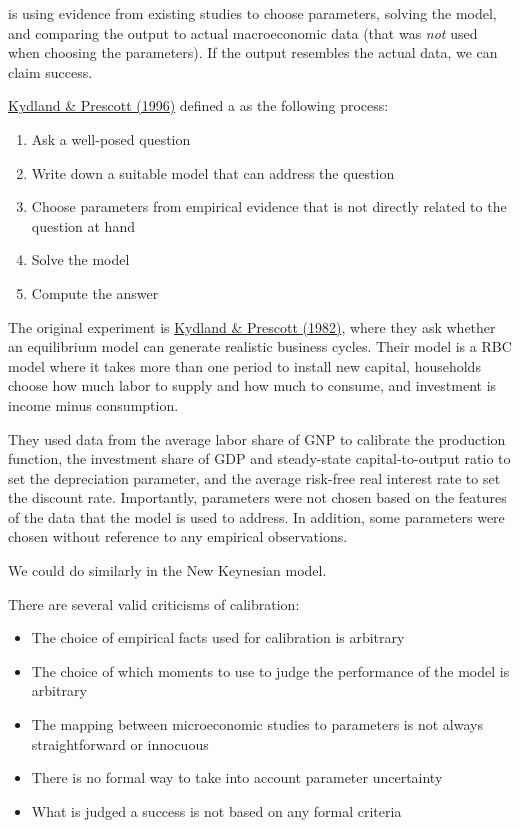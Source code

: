 \documentclass[10pt]{article}
\begin{document}
\begin{definition}
	 is using evidence from existing studies to choose parameters, solving the model, and comparing the output to actual macroeconomic data (that was \emph{not} used when choosing the parameters). If the output resembles the actual data, we can claim success. 
\end{definition}

\href{https://www.aeaweb.org/articles?id=10.1257/jep.10.1.69}{Kydland \& Prescott (1996)} defined a  as the following process:
\begin{enumerate}
	\item Ask a well-posed question
	\item Write down a suitable model that can address the question
	\item Choose parameters from empirical evidence that is not directly related to the question at hand
	\item Solve the model
	\item Compute the answer
\end{enumerate}

\begin{example}
The original experiment is \href{https://www.jstor.org/stable/1913386}{Kydland \& Prescott (1982)}, where they ask whether an equilibrium model can generate realistic business cycles. Their model is a RBC model where it takes more than one period to install new capital, households choose how much labor to supply and how much to consume, and investment is income minus consumption.


They used data from the average labor share of GNP to calibrate the production function, the investment share of GDP and steady-state capital-to-output ratio to set the depreciation parameter, and the average risk-free real interest rate to set the discount rate. Importantly, parameters were not chosen based on the features of the data that the model is used to address. In addition, some parameters were chosen without reference to any empirical observations.
\end{example}

\begin{remark}
	We could do similarly in the New Keynesian model.
\end{remark}


\begin{remark}
	There are several valid criticisms of calibration:
	\begin{itemize}
		\item The choice of empirical facts used for calibration is arbitrary
		\item The choice of which moments to use to judge the performance of the model is arbitrary
		\item The mapping between microeconomic studies to parameters is not always straightforward or innocuous
		\item There is no formal way to take into account parameter uncertainty
		\item What is judged a success is not based on any formal criteria
	\end{itemize}
\end{remark}
\end{document}
